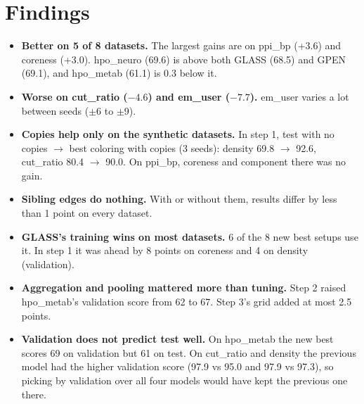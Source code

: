 \documentclass[11pt]{article}
\begin{document}
\section*{Findings}
\begin{itemize}
  \item \textbf{Better on 5 of 8 datasets.} The largest gains are on ppi\_bp (+3.6) and coreness
        (+3.0). hpo\_neuro (69.6) is above both GLASS (68.5) and GPEN (69.1), and hpo\_metab (61.1) is
        0.3 below it.
  \item \textbf{Worse on cut\_ratio ($-4.6$) and em\_user ($-7.7$).} em\_user varies a lot
        between seeds ($\pm$6 to $\pm$9).
  \item \textbf{Copies help only on the synthetic datasets.} In step 1, test with no copies
        $\to$ best coloring with copies (3 seeds): density 69.8 $\to$ 92.6, cut\_ratio 80.4
        $\to$ 90.0. On ppi\_bp, coreness and component there was no gain.
  \item \textbf{Sibling edges do nothing.} With or without them, results differ by less than
        1 point on every dataset.
  \item \textbf{GLASS's training wins on most datasets.} 6 of the 8 new best setups use it.
        In step 1 it was ahead by 8 points on coreness and 4 on density (validation).
  \item \textbf{Aggregation and pooling mattered more than tuning.} Step 2 raised hpo\_metab's
        validation score from 62 to 67. Step 3's grid added at most 2.5 points.
  \item \textbf{Validation does not predict test well.} On hpo\_metab the new best scores 69 on
        validation but 61 on test. On cut\_ratio and density the previous model had the higher
        validation score (97.9 vs 95.0 and 97.9 vs 97.3), so picking by validation over all four
        models would have kept the previous one there.
\end{itemize}
\end{document}
